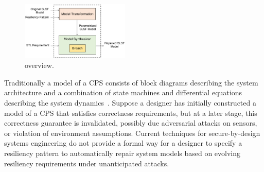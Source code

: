 %
\begin{figure}[t!]%
	\centering%
		\includegraphics[width=0.46\textwidth]{image/overview}%
	\caption{\toolreaffirm overview.} %
    \vspace{-1em}
\end{figure}%
Traditionally a model of a CPS consists of block diagrams describing the system architecture and a combination of state machines and differential equations describing the system dynamics~\cite{alur1995algorithmic}. Suppose a designer has initially constructed a model of a CPS that satisfies correctness requirements, but at a later stage, this correctness guarantee is invalidated, possibly due adversarial attacks on sensors, or violation of environment assumptions. Current techniques for secure-by-design systems engineering do not provide a formal way for a designer to specify a resiliency pattern to automatically repair system models based on evolving resiliency requirements under unanticipated attacks. 

